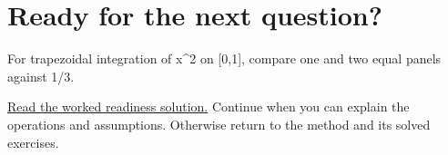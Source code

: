 \section*{Ready for the next question?}
\label{readiness:numerical}
For trapezoidal integration of x\textasciicircum{}2 on [0,1], compare one and two equal panels against 1/3.
\par\hyperref[solution:ready:numerical]{Read the worked readiness solution.} Continue when you can explain the operations and assumptions. Otherwise return to the method and its solved exercises.
